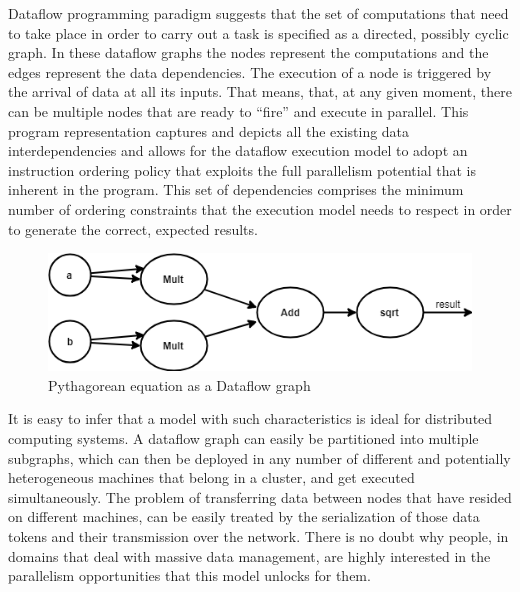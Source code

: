 \documentclass[ack,preface]{dithesis}
\begin{document}
Dataflow programming paradigm suggests that the set of computations that need to take place in order to carry out a task is specified as a directed, possibly cyclic graph. In these dataflow graphs the nodes represent the computations and the edges represent the data dependencies. The execution of a node is triggered by the arrival of data at all its inputs. That means, that, at any given moment, there can be multiple nodes that are ready to “fire” and execute in parallel. This program representation captures and depicts all the existing data interdependencies and allows for the dataflow execution model to adopt an instruction ordering policy that exploits the full parallelism potential that is inherent in the program. This set of dependencies comprises the minimum number of ordering constraints that the execution model needs to respect in order to generate the correct, expected results.

\begin{figure}
\centering
\includegraphics[scale=0.7]{figures/dataflowExample}
\caption{ Pythagorean equation as a Dataflow graph}
\end{figure}

It is easy to infer that a model with such characteristics is ideal for distributed computing systems. A dataflow graph can easily be partitioned into multiple subgraphs, which can then be deployed in any number of different and potentially heterogeneous machines that belong in a cluster, and get executed simultaneously. The problem of transferring data between nodes that have resided on different machines, can be easily treated by the serialization of those data tokens and their transmission over the network.
There is no doubt why people, in domains that deal with massive data management, are highly interested in the parallelism opportunities that this model unlocks for them. \\
\linebreak\linebreak\linebreak\linebreak\linebreak\linebreak
\end{document}
